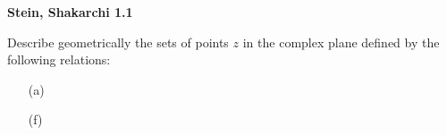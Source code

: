 \textbf{Stein, Shakarchi 1.1}

Describe geometrically the sets of points $z$ in the complex plane defined by the following relations:

\begin{enumerate}
    \item[(a)] 
    \pagebreak
    \item[(f)] 
\end{enumerate}
